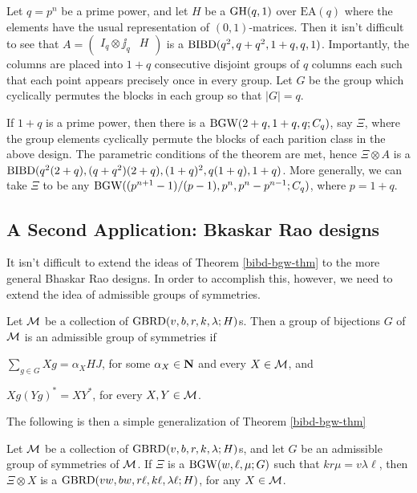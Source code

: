 \documentclass[../../../main]{subfiles}
\begin{document}
 \begin{ex}
  Let $q=p^n$ be a prime power, and let $H$ be a $\text{GH}(q,1)$ over $\text{EA}(q)$ where the elements have the usual representation of $(0,1)$-matrices. Then it isn't difficult to see that $A=(\begin{smallmatrix} I_q \otimes \jj_q & H \end{smallmatrix})$ is a $\text{BIBD}(q^2,q+q^2,1+q,q,1)$. Importantly, the columns are placed into $1+q$ consecutive disjoint groups of $q$ columns each such that each point appears precisely once in every group. Let $G$ be the group which cyclically permutes the blocks in each group so that $|G|=q$.
  
  If $1+q$ is a prime power, then there is a $\text{BGW}(2+q,1+q,q;C_q)$, say $\Xi$, where the group elements cyclically permute the blocks of each parition class in the above design. The parametric conditions of the theorem are met, hence $\Xi \otimes A$ is a $\text{BIBD}(q^2(2+q),(q+q^2)(2+q),(1+q)^2,q(1+q),1+q)$. More generally, we can take $\Xi$ to be any $\text{BGW}((p^{n+1}-1)/(p-1),p^n,p^n-p^{n-1};C_q)$, where $p=1+q$.
 \end{ex}

\dinkus

\subsection{A Second Application: Bkaskar Rao designs}

It isn't difficult to extend the ideas of Theorem \ref{bibd-bgw-thm} to the more general Bhaskar Rao designs. In order to accomplish this, however, we need to extend the idea of admissible groups of symmetries.

Let $\mathcal{M}$ be a collection of $\text{GBRD}(v,b,r,k,\lambda;H)$s. Then a group of bijections $G$ of $\mathcal{M}$ is an admissible group of symmetries if 
\begin{enumerate*}[(a)]
\item $\sum_{g \in G}Xg=\alpha_XHJ$, for some $\alpha_X \in \mathbf{N}$ and every $X \in \mathcal{M}$, and 
\item $Xg(Yg)^* = XY^*$, for every $X,Y \in \mathcal{M}$.
\end{enumerate*}

The following is then a simple generalization of Theorem \ref{bibd-bgw-thm}

\begin{thm}\label{gbrd-bgw-thm}
 Let $\mathcal{M}$ be a collection of $\text{GBRD}(v,b,r,k,\lambda;H)$s, and let $G$ be an admissible group of symmetries of $\mathcal{M}$. If $\Xi$ is a $\text{BGW}(w,\ell,\mu;G)$ such that $kr\mu=v\lambda\ell$, then $\Xi \otimes X$ is a $\text{GBRD}(vw,bw,r\ell,k\ell,\lambda\ell;H)$, for any $X \in \mathcal{M}$.
\end{thm}
\end{document}

